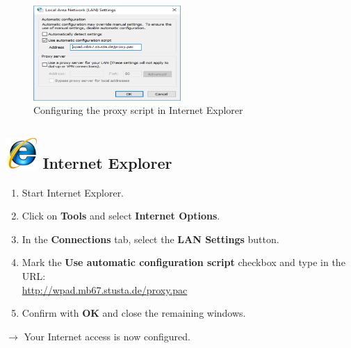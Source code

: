 \documentclass[a4paper,12pt]{scrartcl}
\newcommand{\optemph}[1]{\textbf{#1}}
\begin{document}
\begin{figure}
  \begin{center}
    \includegraphics[width=0.5\textwidth,keepaspectratio]{Bilder/Proxy_IE_EN_mb}
  \end{center}
  \caption{Configuring the proxy script in Internet Explorer}
\end{figure}

\subsection*{\includegraphics[height=1.2cm,keepaspectratio]{Bilder/Internet_Explorer_7_Logo} Internet Explorer}
\begin{enumerate}
    \item Start Internet Explorer.
	\item Click on \optemph{Tools} and select \optemph{Internet Options}.
	\item In the \optemph{Connections} tab, select the \optemph{LAN Settings} button.
	\item Mark the \optemph{Use automatic configuration script} checkbox and type in the URL: \\ \url{http://wpad.mb67.stusta.de/proxy.pac}
	\item Confirm with \optemph{OK} and close the remaining windows.
\end{enumerate}
$\rightarrow$ Your Internet access is now configured.
\end{document}
